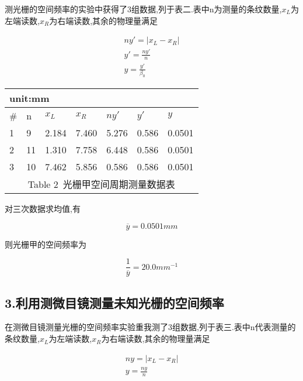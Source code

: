 \documentclass[a4paper,10pt,notitlepage]{report}
\begin{document}
	测光栅的空间频率的实验中获得了3组数据,列于表二.表中n为测量的条纹数量,$x_L$为左端读数,$x_R$为右端读数,其余的物理量满足
	
\begin{align}
	ny' = |x_L - x_R| \\
	y' = \frac{ny'}{n} \\
	y = \frac{y'}{\beta_0}
\end{align}

\begin{table}[htbp]
\centering
	\begin{tabular}{|l|l|l|l|l|l|l|}
		
		\multicolumn{7}{l}{\scriptsize unit:mm} \\
		\hline
		\# & n & $x_L$ & $x_R$ & $ny'$ & $y'$ & $y$ \\
		\hline
		1 & 9 & 2.184 & 7.460 & 5.276 & 0.586 & 0.0501 \\
		\hline
		2 & 11 & 1.310 & 7.758 & 6.448 & 0.586 & 0.0501 \\
		\hline
		3 & 10 & 7.462 & 5.856 & 0.586 & 0.586 & 0.0501 \\
		\hline
		\multicolumn{7}{c}{\scriptsize Table 2\ 光栅甲空间周期测量数据表}
		
	\end{tabular}
\end{table}

	对三次数据求均值,有

\begin{equation}
	\overline{y} = 0.0501mm
\end{equation}

	则光栅甲的空间频率为
	
\begin{equation}
	\frac{1}{\overline{y}} = 20.0 mm^{-1}
\end{equation}

\subsection*{3.利用测微目镜测量未知光栅的空间频率}

	在测微目镜测量光栅的空间频率实验重我测了3组数据,列于表三.表中n代表测量的条纹数量,$x_L$为左端读数,$x_R$为右端读数,其余的物理量满足
	
\begin{align}
	ny = |x_L - x_R| \\
	y = \frac{ny}{n}
\end{align}
\end{document}
